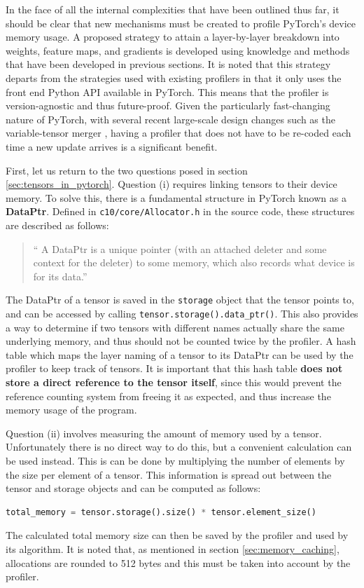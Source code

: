 \documentclass[12pt,letterpaper]{article}
\begin{document}
In the face of all the internal complexities that have been outlined thus far, it should be clear that new mechanisms must be created to profile PyTorch's device memory usage. A proposed strategy to attain a layer-by-layer breakdown into weights, feature maps, and gradients is developed using knowledge and methods that have been developed in previous sections. It is noted that this strategy departs from the strategies used with existing profilers in that it only uses the front end Python API available in PyTorch. This means that the profiler is version-agnostic and thus future-proof. Given the particularly fast-changing nature of PyTorch, with several recent large-scale design changes such as the variable-tensor merger \cite{pytorch_variable_tensor_merger}, having a profiler that does not have to be re-coded each time a new update arrives is a significant benefit. 
\par 

First, let us return to the two questions posed in section \ref{sec:tensors_in_pytorch}. Question (i) requires linking tensors to their device memory. To solve this, there is a fundamental structure in PyTorch known as a \textbf{DataPtr}. Defined in \texttt{c10/core/Allocator.h} in the source code, these structures are described as follows:
\begin{quote}
\enquote{
A DataPtr is a unique pointer (with an attached deleter and some context for the deleter) to some memory, which also records what device is for its data.}
\end{quote}
The DataPtr of a tensor is saved in the \texttt{storage} object that the tensor points to, and can be accessed by calling \texttt{tensor.storage().data\_ptr()}. This also provides a way to determine if two tensors with different names actually share the same underlying memory, and thus should not be counted twice by the profiler. A hash table which maps the layer naming of a tensor to its DataPtr can be used by the profiler to keep track of tensors. It is important that this hash table \textbf{does not store a direct reference to the tensor itself}, since this would prevent the reference counting system from freeing it as expected, and thus increase the memory usage of the program. 
\par 

Question (ii) involves measuring the amount of memory used by a tensor. Unfortunately there is no direct way to do this, but a convenient calculation can be used instead. This is can be done by multiplying the number of elements by the size per element of a tensor. This information is spread out between the tensor and storage objects and can be computed as follows:
\begin{lstlisting}[language=Python]
total_memory = tensor.storage().size() * tensor.element_size()
\end{lstlisting}
The calculated total memory size can then be saved by the profiler and used by its algorithm. It is noted that, as mentioned in section \ref{sec:memory_caching}, allocations are rounded to 512 bytes and this must be taken into account by the profiler.
\par 
\end{document}
